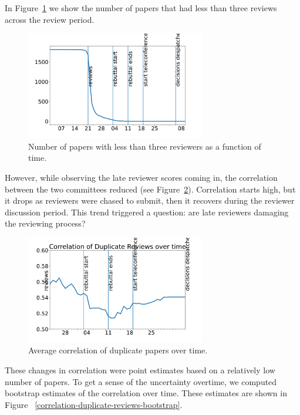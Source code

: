 In Figure~\ref{paper-short-reviews} we show the number of
papers that had less than three reviews across the review period.

\begin{figure}[htb]
\centering
\includegraphics[width=0.70\textwidth]{diagrams/neurips/paper-short-reviews.pdf}

\caption{Number of papers with less than three reviewers as a function of time.}
\label{paper-short-reviews}
\end{figure}

However, while observing the late reviewer scores coming in, the correlation between the two committees reduced (see Figure~\ref{correlation-duplicate-reviews}). Correlation starts high, but it drops as reviewers were chased to submit, then it recovers during the reviewer discussion period. This trend triggered a question: are late reviewers damaging the reviewing process?

\begin{figure}[htb]
\centering
\includegraphics[width=0.70\textwidth]{diagrams/neurips/correlation-duplicate-reviews.pdf}


\caption{Average correlation of duplicate papers over time.}
\label{correlation-duplicate-reviews}
\end{figure}

These changes in correlation were point estimates based on a relatively low number of papers. To get a sense of the uncertainty overtime, we computed bootstrap estimates of the correlation over time. These estimates are shown in Figure~ \ref{correlation-duplicate-reviews-bootstrap}.

